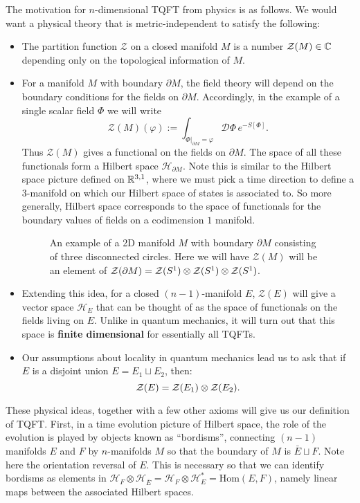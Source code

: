 	
	The motivation for $n$-dimensional TQFT from physics is as follows. We would want a physical theory that is metric-independent to satisfy the following: 
	\begin{itemize}
		\item The partition function $\mathcal Z$ on a closed manifold $M$ is a number $\mathcal Z(M) \in \mathbb{C}$ depending only on the topological information of $M$.
		\item For a manifold $M$ with boundary $\partial M$, the field theory will depend on the boundary conditions for the fields on $\partial M$. Accordingly, in the example of a single scalar field $\Phi$ we will write
		\[
			\mathcal Z(M) (\varphi) := \int_{\Phi|_{\partial M} = \varphi} \mathcal D \Phi\, e^{- S[\Phi]}.
		\]
		Thus $\mathcal Z(M)$ gives a functional on the fields on $\partial M$. The space of all these functionals form a Hilbert space $\mathcal H_{\partial M}$. Note this is similar to the Hilbert space picture defined on $\mathbb{R}^{3,1}$, where we must pick a time direction to define a $3$-manifold on which our Hilbert space of states is associated to. So more generally, Hilbert space corresponds to the space of functionals for the boundary values of fields on a codimension $1$ manifold.
		\begin{figure}
			\centering
			\caption{An example of a 2D manifold $M$ with boundary $\partial M$ consisting of three disconnected circles. Here we will have $\mathcal Z(M)$ will be an element of $\mathcal Z(\partial M) = \mathcal{Z}(S^1) \otimes \mathcal{Z}(S^1) \otimes \mathcal{Z}(S^1)$.}
			\label{fig:tqft1}
		\end{figure}
		\item Extending this idea, for a closed $(n-1)$-manifold $E$, $\mathcal Z(E)$ will give a vector space $\mathcal H_E$ that can be thought of as the space of functionals on the fields living on $E$. Unlike in quantum mechanics, it will turn out that this space is \textbf{finite dimensional} for essentially all TQFTs.
		\item Our assumptions about locality in quantum mechanics lead us to ask that if $E$ is a disjoint union $E = E_1 \sqcup E_2$, then:
		\[
			\mathcal{Z}(E) = \mathcal{Z}(E_1) \otimes \mathcal{Z}(E_2).
		\]
	\end{itemize}
	These physical ideas, together with a few other axioms will give us our definition of TQFT. First, in a time evolution picture of Hilbert space, the role of the evolution is played by objects known as ``bordisms'', connecting $(n-1)$ manifolds $E$ and $F$ by $n$-manifolds $M$ so that the boundary of $M$ is $\bar E \sqcup F$. Note here the orientation reversal of $E$. This is necessary so that we can identify bordisms as elements in $\mathcal H_{F} \otimes \mathcal H_{\bar E} = \mathcal H_{F} \otimes \mathcal H_E^*  = \mathrm{Hom}(E, F)$, namely linear maps between the associated Hilbert spaces.


